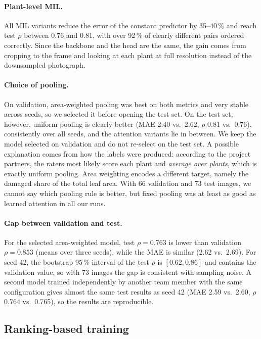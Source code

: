 \paragraph{Plant-level MIL.} All MIL variants reduce the error of the constant predictor
by 35--40\,\% and reach test $\rho$ between 0.76 and 0.81, with over 92\,\% of clearly different pairs
ordered correctly. Since the backbone and the head are the same, the gain comes from cropping
to the frame and looking at each plant at full resolution instead of the downsampled photograph.

\paragraph{Choice of pooling.} On validation,
area-weighted pooling was best on both metrics and very stable across seeds, so we selected it
before opening the test set. On the test set, however, uniform pooling
is clearly better (MAE 2.40 vs.\ 2.62, $\rho$ 0.81 vs.\ 0.76), consistently over all seeds, and the
attention variants lie in between. We keep the model selected on validation and do not re-select on the
test set. A possible explanation comes from how the labels were produced: according to the project partners,
the raters most likely score each plant and \emph{average over plants}, which is exactly uniform
pooling. Area weighting encodes a different target, namely the damaged share of the total leaf
area. With 66 validation and 73 test images, we cannot say which pooling rule is better,
but fixed pooling was at least as good as learned attention in all our runs.

\paragraph{Gap between validation and test.} For the selected area-weighted model, test $\rho = 0.763$ is
lower than validation $\rho = 0.853$ (means over three seeds), while the MAE is similar (2.62 vs.\
2.69). For seed 42, the bootstrap 95\,\% interval of the test $\rho$ is $[0.62, 0.86]$ and contains
the validation value, so with 73 images the gap is consistent with sampling noise. A second model
trained independently by another team member with the same configuration gives almost the same
test results as seed 42 (MAE 2.59 vs.\ 2.60, $\rho$ 0.764 vs.\ 0.765), so the results are
reproducible.

\subsection{Ranking-based training}
\label{sec:res-ranking}

